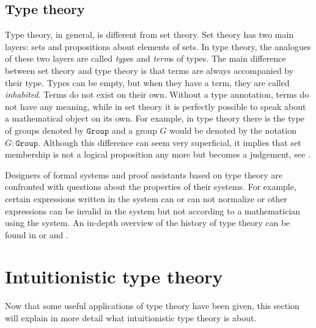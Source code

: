 \documentclass[12pt,a4paper,twoside,xetex]{book} %
\newcommand{\keyword}[1]{\emph{#1}\index{#1}}
\newcommand{\op}[1]{\mathtt{#1}}
\begin{document}




\subsection{Type theory}

Type theory, in general, is different from set theory. Set theory has two main layers: sets and propositions about elements of sets. In type theory, the analogues of these two layers are called \keyword{type}s and \keyword{term}s of types. The main difference between set theory and type theory is that terms are always accompanied by their type. Types can be empty, but when they have a term, they are called \keyword{inhabited}. Terms do not exist on their own. Without a type annotation, terms do not have any meaning, while in set theory it is perfectly possible to speak about a mathematical object on its own. For example, in type theory there is the type of groups denoted by $\op{Group}$ and a group $G$ would be denoted by the notation $G : \op{Group}$. Although this difference can seem very superficial, it implies that set membership is not a logical proposition any more but becomes a judgement, see .

Designers of formal systems and proof assistants based on type theory are confronted with questions about the properties of their systems. For example, certain expressions written in the system can or can not normalize or other expressions can be invalid in the system but not according to a mathematician using the system. An in-depth overview of the history of type theory can be found in \cite{Coquand2013oct} or \cite{Constable2011} and \cite{Constable2015July}.


\section{Intuitionistic type theory}

Now that some useful applications of type theory have been given, this section will explain in more detail what intuitionistic type theory \cite{Martin-Loef1975} is about.
\end{document}
